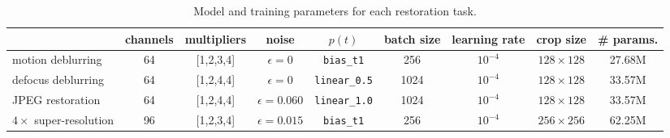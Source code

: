 
\begin{table}[ht]
\small
\setlength{\tabcolsep}{3pt}
\centering
\caption{Model and training parameters for each restoration task.}
\label{table:model_params}
\begin{tabular}{lcccccccc}
\toprule
	& channels	& multipliers	& noise & $p(t)$ & batch size	& learning rate &	crop size & \# params. \\ \midrule
motion deblurring & 	64 & 	[1,2,3,4] & $\epsilon=0$ & \texttt{bias\_t1} &256	& $10^{-4}$ & $128\times128$ & 	27.68M \\
defocus deblurring & 	64  & 	[1,2,4,4] & $\epsilon=0$ & \texttt{linear\_0.5} &1024 & $10^{-4}$ & 	$128\times128$ & 	33.57M  \\
JPEG restoration  & 	64	& [1,2,4,4] & 	$\epsilon=0.060$ & \texttt{linear\_1.0}  &1024 & $10^{-4}$ & $128\times128$ & 	33.57M \\
$4\times$ super-resolution & 96 & [1,2,3,4] & $\epsilon=0.015$ & \texttt{bias\_t1} &256 & $10^{-4}$ & $256\times256$ & 62.25M \\
\bottomrule
\end{tabular}
\end{table}